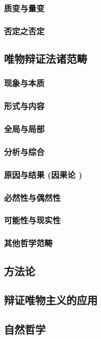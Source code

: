 \documentclass[UTF8]{../RepresentationUniverse}
\begin{document}
    \subsubsection{质变与量变}
    \subsubsection{否定之否定}

\subsection{唯物辩证法诸范畴}
    \subsubsection{现象与本质}
    \subsubsection{形式与内容}
    \subsubsection{全局与局部}
    \subsubsection{分析与综合}
    \subsubsection{原因与结果 (因果论 )}
    \subsubsection{必然性与偶然性}
    \subsubsection{可能性与现实性}
    \subsubsection{其他哲学范畴}

\subsection{方法论}
\subsection{辩证唯物主义的应用}
\subsection{自然哲学}
\end{document}

